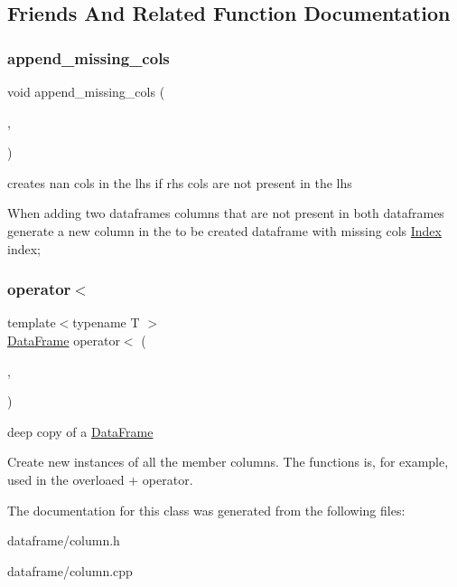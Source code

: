 \subsection{Friends And Related Function Documentation}
\mbox{\label{classColumn_a27cc8acd51a5cd40e6a2726368914661}} 
\subsubsection{\texorpdfstring{append\+\_\+missing\+\_\+cols}{append\_missing\_cols}}
{\footnotesize\ttfamily void append\+\_\+missing\+\_\+cols (\begin{DoxyParamCaption}\item[{\hyperlink{classDataFrame}{Data\+Frame} \&}]{,  }\item[{const \hyperlink{classDataFrame}{Data\+Frame} \&}]{ }\end{DoxyParamCaption})\hspace{0.3cm}{\ttfamily [friend]}}



creates nan cols in the lhs if rhs cols are not present in the lhs 

When adding two dataframes columns that are not present in both dataframes generate a new column in the to be created dataframe with missing cols \hyperlink{classIndex}{Index} index; \mbox{\label{classColumn_a92ccb0425c54a5b5cd6f78ed1bb4c3ff}} 
\subsubsection{\texorpdfstring{operator$<$}{operator<}}
{\footnotesize\ttfamily template$<$typename T $>$ \\
\hyperlink{classDataFrame}{Data\+Frame} operator$<$ (\begin{DoxyParamCaption}\item[{const \hyperlink{classDataFrame}{Data\+Frame} \&}]{,  }\item[{const T \&}]{ }\end{DoxyParamCaption})\hspace{0.3cm}{\ttfamily [friend]}}



deep copy of a \hyperlink{classDataFrame}{Data\+Frame} 

Create new instances of all the member columns. The functions is, for example, used in the overloaed + operator. 

The documentation for this class was generated from the following files\+:\begin{DoxyCompactItemize}
\item 
dataframe/column.\+h\item 
dataframe/column.\+cpp\end{DoxyCompactItemize}
